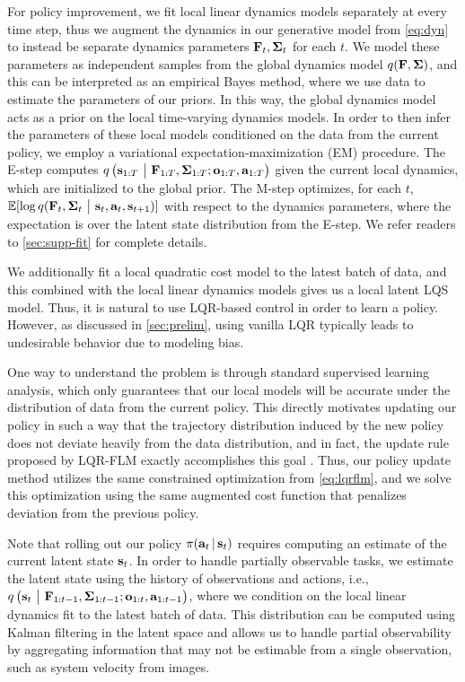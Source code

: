 For policy improvement, we fit local linear dynamics models separately at every time step, thus we augment the dynamics in our generative model from \autoref{eq:dyn} to instead be separate dynamics parameters $\mathbf{F}_t,\bm{\Sigma}_t$ for each $t$. We model these parameters as independent samples from the global dynamics model $q(\mathbf{F},\bm{\Sigma})$, and this can be interpreted as an empirical Bayes method, where we use data to estimate the parameters of our priors. In this way, the global dynamics model acts as a prior on the local time-varying dynamics models. In order to then infer the parameters of these local models conditioned on the data from the current policy, we employ a variational expectation-maximization (EM) procedure. The E-step computes $q\left(\mathbf{s}_{1:T}~\big|~\mathbf{F}_{1:T},\bm{\Sigma}_{1:T};\mathbf{o}_{1:T},\mathbf{a}_{1:T}\right)$ given the current local dynamics, which are initialized to the global prior. The M-step optimizes, for each $t$, $\mathbb{E}[\log{q}(\mathbf{F}_t,\bm{\Sigma}_t~\big|~\mathbf{s}_t,\mathbf{a}_t,\mathbf{s}_{t+1})]$ with respect to the dynamics parameters, where the expectation is over the latent state distribution from the E-step. We refer readers to \autoref{sec:supp-fit} for complete details.

We additionally fit a local quadratic cost model to the latest batch of data, and this combined with the local linear dynamics models gives us a local latent LQS model. Thus, it is natural to use LQR-based control in order to learn a policy. However, as discussed in \autoref{sec:prelim}, using vanilla LQR typically leads to undesirable behavior due to modeling bias.

One way to understand the problem is through standard supervised learning analysis, which only guarantees that our local models will be accurate under the distribution of data from the current policy. This directly motivates updating our policy in such a way that the trajectory distribution induced by the new policy does not deviate heavily from the data distribution, and in fact, the update rule proposed by LQR-FLM exactly accomplishes this goal \citep{mfcgps}. Thus, our policy update method utilizes the same constrained optimization from \autoref{eq:lqrflm}, and we solve this optimization using the same augmented cost function that penalizes deviation from the previous policy.

Note that rolling out our policy $\pi(\mathbf{a}_t\,|\,\mathbf{s}_t)$ requires computing an estimate of the current latent state $\mathbf{s}_t$. In order to handle partially observable tasks, we estimate the latent state using the history of observations and actions, i.e., $q\left(\mathbf{s}_t~\big|~\mathbf{F}_{1:t-1},\bm{\Sigma}_{1:t-1};\mathbf{o}_{1:t},\mathbf{a}_{1:t-1}\right)$, where we condition on the local linear dynamics fit to the latest batch of data. This distribution can be computed using Kalman filtering in the latent space and allows us to handle partial observability by aggregating information that may not be estimable from a single observation, such as system velocity from images.


